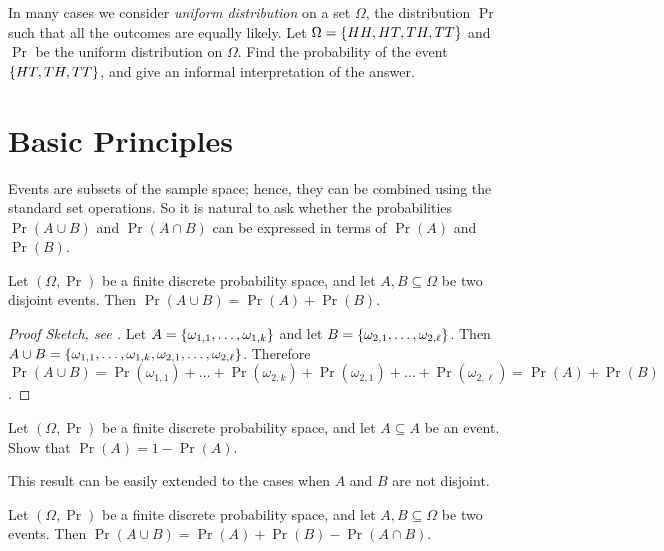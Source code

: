 \begin{exercise}
  In many cases we consider \emph{uniform distribution} on a set $\Omega$, the
  distribution $\Pr$ such that all the outcomes are equally likely.
  Let $\Omega = \set{HH, HT, TH, TT}$ and $\Pr$ be the uniform distribution on
  $\Omega$. Find the probability of the event $\set{HT, TH, TT}$, and give an
  informal interpretation of the answer.
\end{exercise}

\section{Basic Principles}

Events are subsets of the sample space; hence, they can be combined using the
standard set operations. So it is natural to ask whether the probabilities
$\Pr(A \cup B)$ and $\Pr(A \cap B)$ can be expressed in terms of $\Pr(A)$ and
$\Pr(B)$.

\begin{theorem}
  Let $(\Omega, \Pr)$ be a finite discrete probability space, and let $A, B
  \subseteq \Omega$ be two disjoint events. Then 
  $\Pr(A \cup B) = \Pr(A) + \Pr(B)$.
\end{theorem}
\begin{proof}[Proof Sketch, see ]
  Let $A = \set{\omega_{1, 1}, \dots, \omega_{1, k}}$ and 
  let $B = \set{\omega_{2, 1}, \dots, \omega_{2, \ell}}$. 
  Then $A \cup B = \set{\omega_{1, 1}, \dots, \omega_{1, k}, 
    \omega_{2, 1}, \dots, \omega_{2, \ell}}$.
  Therefore $\Pr(A \cup B) = 
    \Pr(\omega_{1, 1}) + \dots + \Pr(\omega_{2, k}) +
    \Pr(\omega_{2, 1}) + \dots + \Pr(\omega_{2, \ell}) = \Pr(A) + \Pr(B)$.
\end{proof}

\begin{exercise}
  Let $(\Omega, \Pr)$ be a finite discrete probability space, and let $A
  \subseteq A$ be an event. Show that $\Pr(A) = 1 - \Pr(A)$.
\end{exercise}

This result can be easily extended to the cases when $A$ and $B$ are not
disjoint.
\begin{corollary}
\label{corollary:inclusion-exclusion-probability}
  Let $(\Omega, \Pr)$ be a finite discrete probability space, and let $A, B
  \subseteq \Omega$ be two events. Then 
  $\Pr(A \cup B) = \Pr(A) + \Pr(B) - \Pr(A \cap B)$.
\end{corollary}

